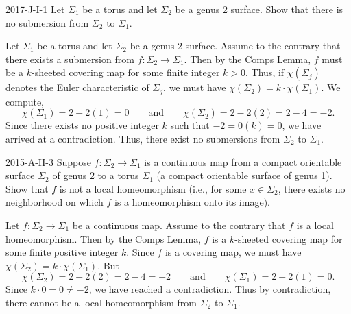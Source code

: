 \documentclass{article}
\begin{document}
	\begin{prb}{2017-J-I-1}
		Let $\Sigma_{1}$ be a torus and let $\Sigma_{2}$ be a genus 2 surface. Show that there is no submersion from $\Sigma_{2}$ to $\Sigma_{1}$. 
	\end{prb}
	
	Let $\Sigma_{1}$ be a torus and let $\Sigma_{2}$ be a genus 2 surface. Assume to the contrary that there exists a submersion from $f: \Sigma_{2} \to \Sigma_{1}$. Then by the Comps Lemma, $f$ must be a $k$-sheeted covering map for some finite integer $k > 0$. Thus, if $\chi(\Sigma_{j})$ denotes the Euler characteristic of $\Sigma_{j}$, we must have $\chi(\Sigma_{2}) = k \cdot \chi(\Sigma_{1})$. We compute, 
	\begin{equation*}
		\chi(\Sigma_{1}) = 2 - 2(1) = 0 \qquad \text{and} \qquad \chi(\Sigma_{2}) = 2- 2(2) =  2 -4 = -2. 
	\end{equation*}
	Since there exists no positive integer $k$ such that $-2 = 0(k) = 0$, we have arrived at a contradiction. Thus, there exist no submersions from $\Sigma_{2}$ to $\Sigma_{1}$. 
	
	\begin{prb}{2015-A-II-3}
		Suppose $f: \Sigma_{2} \to \Sigma_{1}$ is a continuous map from a compact orientable surface $\Sigma_{2}$ of genus 2 to a torus $\Sigma_{1}$ (a compact orientable surface of genus 1). Show that $f$ is not a local homeomorphism (i.e., for some $x\in \Sigma_{2}$, there exists no neighborhood on which $f$ is a homeomorphism onto its image). 
	\end{prb}
	
	Let $f: \Sigma_{2} \to \Sigma_{1}$ be a continuous map. Assume to the contrary that $f$ is a local homeomorphism. Then by the Comps Lemma, $f$ is a $k$-sheeted covering map for some finite positive integer $k$. Since $f$ is a covering map, we must have $\chi(\Sigma_{2}) = k \cdot \chi(\Sigma_{1})$. But 
	\begin{equation*}
		\chi(\Sigma_{2}) = 2 - 2(2) = 2-4 = -2 \qquad \text{and} \qquad \chi(\Sigma_{1}) = 2 - 2(1) = 0. 
	\end{equation*}
	Since $k \cdot 0= 0 \neq -2$, we have reached a contradiction. Thus by contradiction, there cannot be a local homeomorphism from $\Sigma_{2}$ to $\Sigma_{1}$. 
	
\end{document}
